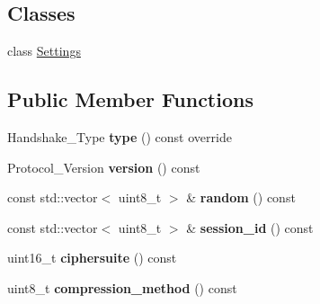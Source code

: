 \subsection*{Classes}
\begin{DoxyCompactItemize}
\item 
class \hyperlink{class_botan_1_1_t_l_s_1_1_server___hello_1_1_settings}{Settings}
\end{DoxyCompactItemize}
\subsection*{Public Member Functions}
\begin{DoxyCompactItemize}
\item 
\mbox{\label{class_botan_1_1_t_l_s_1_1_server___hello_a2e7d2d74c21312a9a529bff460a624b1}} 
Handshake\+\_\+\+Type {\bfseries type} () const override
\item 
\mbox{\label{class_botan_1_1_t_l_s_1_1_server___hello_ab0ea92e3bc88b7ce3bfa1375ada96621}} 
Protocol\+\_\+\+Version {\bfseries version} () const
\item 
\mbox{\label{class_botan_1_1_t_l_s_1_1_server___hello_a96aeea79169892a102ff9b135e0ff72b}} 
const std\+::vector$<$ uint8\+\_\+t $>$ \& {\bfseries random} () const
\item 
\mbox{\label{class_botan_1_1_t_l_s_1_1_server___hello_ae5ef5f2edf115291f8a9391202b8dfbc}} 
const std\+::vector$<$ uint8\+\_\+t $>$ \& {\bfseries session\+\_\+id} () const
\item 
\mbox{\label{class_botan_1_1_t_l_s_1_1_server___hello_a0fe70e754f6c21dd68afdfd29624d13b}} 
uint16\+\_\+t {\bfseries ciphersuite} () const
\item 
\mbox{\label{class_botan_1_1_t_l_s_1_1_server___hello_a3d2ae3d21a68a9fa116c275b464eece4}} 
uint8\+\_\+t {\bfseries compression\+\_\+method} () const
\item 
\mbox{\label{class_botan_1_1_t_l_s_1_1_server___hello_aa54d992ffe3abc194024f3f598e3e440}} 

\end{DoxyCompactItemize}
